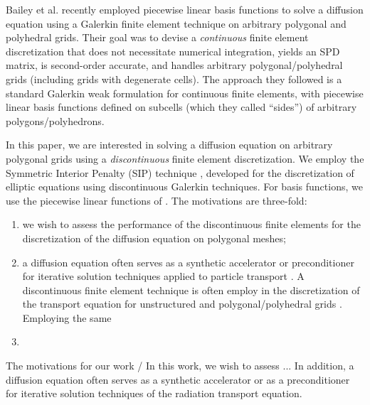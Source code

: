 \documentclass[preprint,10pt]{elsarticle}
\begin{document}
%
Bailey et al. \cite{BaileyAdams2008} recently employed piecewise linear basis
functions to solve a diffusion equation using a Galerkin finite element technique on 
arbitrary polygonal and polyhedral grids. Their goal was to devise a {\em continuous} finite 
element discretization that does not necessitate numerical integration, yields an SPD matrix, 
is second-order accurate, and handles arbitrary polygonal/polyhedral grids (including 
grids with degenerate cells). The approach they followed is a standard Galerkin weak 
formulation for continuous finite elements, with piecewise linear basis functions 
defined on subcells (which they called ``sides'') of arbitrary polygons/polyhedrons.

In this paper, we are interested in solving a diffusion equation on arbitrary polygonal
grids using a {\em discontinuous} finite element discretization. We employ the
Symmetric Interior Penalty (SIP) technique \cite{IPRefs}, developed for the discretization
of elliptic equations using discontinuous Galerkin techniques. For basis functions,
we use the piecewise linear functions of \cite{BaileyAdams2008}.
The motivations are three-fold: 
\begin{enumerate}
\item we wish to assess the performance of the discontinuous finite elements for 
	the discretization of the diffusion equation on polygonal meshes;
\item a diffusion equation often serves as a synthetic accelerator or 
	preconditioner for iterative solution techniques applied to particle transport
	\cite{AdamsLarsen2002}. A discontinuous finite element technique is often employ
	in the discretization of the transport equation for unstructured and 
	polygonal/polyhedral grids \cite{MorelWarsaWareing,PWLD,CFEM-PWDL-Warsa,WangRagusa}.
  Employing the same    
\item 
\end{enumerate}
The motivations for our work / In this work, we wish to assess ... In addition,
a diffusion equation often serves as a synthetic accelerator or as a
preconditioner \cite{AdamsLarsen2002} for iterative solution techniques of the 
radiation transport equation.
\end{document}
